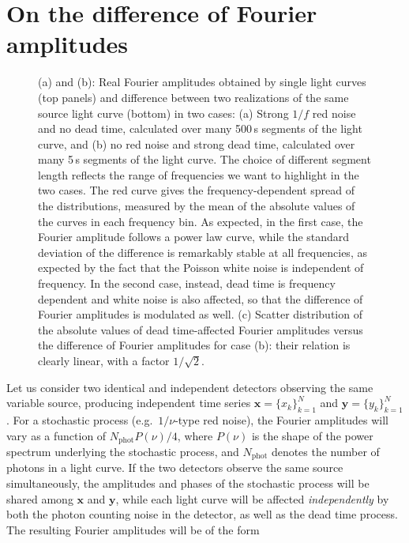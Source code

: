 \documentclass[twocolumn]{aastex61}
\begin{document}
\section{On the difference of Fourier amplitudes} \label{sec:fourierdiff}
\begin{figure*}
          
\caption{(a) and (b): Real Fourier amplitudes obtained by single light curves (top panels) and difference between two realizations of the same source light curve (bottom) in two cases: (a) Strong $1/f$ red noise and no dead time, calculated over many 500\,s segments of the light curve, and (b) no red noise and strong dead time, calculated over many 5\,s segments of the light curve. 
The choice of different segment length reflects the range of frequencies we want to highlight in the two cases.
The red curve gives the frequency-dependent spread of the distributions, measured by the mean of the absolute values of the curves in each frequency bin. 
As expected, in the first case, the Fourier amplitude follows a power law curve, while the standard deviation of the difference is remarkably stable at all frequencies, as expected by the fact that the Poisson white noise is independent of frequency. 
In the second case, instead, dead time is frequency dependent and white noise is also affected, so that the difference of Fourier amplitudes is modulated as well.
(c) Scatter distribution of the absolute values of dead time-affected Fourier amplitudes versus the difference of Fourier amplitudes for case (b): their relation is clearly linear, with a factor $1/\sqrt{2}$. 
}
\label{fig:fourierdiff}
\end{figure*}

Let us consider two identical and independent detectors observing the same variable source, producing independent time series $\mathbf{x} = \{x_k\}_{k=1}^N$ and $\mathbf{y} = \{y_k\}_{k=1}^N$. For a stochastic process (e.g.\ $1/\nu$-type red noise), the Fourier amplitudes will vary as a function of $N_{\mathrm{phot}}P(\nu)/4$, where $P(\nu)$ is the shape of the power spectrum underlying the stochastic process, and $N_{\mathrm{phot}}$ denotes the number of photons in a light curve. If the two detectors observe the same source simultaneously, the amplitudes and phases of the stochastic process will be shared among $\mathbf{x}$ and $\mathbf{y}$, while each light curve will be affected \textit{independently} by both the photon counting noise in the detector, as well as the dead time process. The resulting Fourier amplitudes will be of the form
\end{document}

